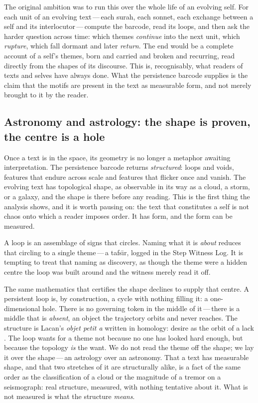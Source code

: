 The original ambition was to run this over the whole life of an evolving self.
For each unit of an evolving text\,---\,each surah, each sonnet, each exchange
between a self and its interlocutor\,---\,compute the barcode, read its loops, and
then ask the harder question across time: which themes \textit{continue} into the
next unit, which \textit{rupture}, which fall dormant and later \textit{return}.
The end would be a complete account of a self's themes, born and carried and
broken and recurring, read directly from the shapes of its discourse.  This is,
recognisably, what readers of texts and selves have always done.  What the
persistence barcode supplies is the claim that the motifs are present in the text
as measurable form, and not merely brought to it by the reader.

\subsection{Astronomy and astrology: the shape is proven, the centre is a hole}

Once a text is in the space, its geometry is no longer a metaphor awaiting
interpretation.  The persistence barcode returns \textit{structured}: loops and
voids, features that endure across scale and features that flicker once and
vanish.  The evolving text has topological shape, as observable in its way as a
cloud, a storm, or a galaxy, and the shape is there before any reading.  This is
the first thing the analysis shows, and it is worth pausing on: the text that
constitutes a self is not chaos onto which a reader imposes order.  It has form,
and the form can be measured.

A loop is an assemblage of signs that circles.  Naming what it is \textit{about}
reduces that circling to a single theme\,---\,a tafs\=\i r, logged in the Step
Witness Log.  It is tempting to treat that naming as discovery, as though the
theme were a hidden centre the loop was built around and the witness merely read
it off.

The same mathematics that certifies the shape declines to supply that centre.  A
persistent loop is, by construction, a cycle with nothing filling it: a
one-dimensional hole.  There is no governing token in the middle of it\,---\,there
is a middle that is \textit{absent}, an object the trajectory orbits and never
reaches.  The structure is Lacan's \textit{objet petit a} written in homology:
desire as the orbit of a lack \cite{lacan1977}.  The loop wants for a theme not
because no one has looked hard enough, but because the topology \textit{is} the
want.  We do not read the theme off the shape; we lay it over the shape\,---\,an
astrology over an astronomy.  That a text has measurable shape, and that two
stretches of it are structurally alike, is a fact of the same order as the
classification of a cloud or the magnitude of a tremor on a seismograph: real
structure, measured, with nothing tentative about it.  What is not measured is what
the structure \textit{means}.

